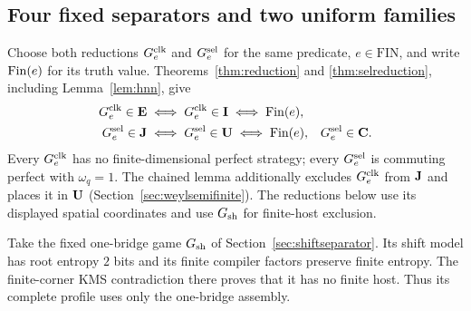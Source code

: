 \subsection{Four fixed separators and two uniform families}
Choose both reductions $G^{\rm clk}_e$ and $G^{\rm sel}_e$ for the same predicate, $e\in\mathrm{FIN}$, and write $\mathrm{Fin}(e)$ for its truth value. Theorems~\ref{thm:reduction} and \ref{thm:selreduction}, including Lemma~\ref{lem:hnn}, give
\begin{align}
 G^{\rm clk}_e\in\mathbf E&\iff G^{\rm clk}_e\in\mathbf I\iff \mathrm{Fin}(e),
 &&\label{eq:sharedE}\\
 G^{\rm sel}_e\in\mathbf J&\iff G^{\rm sel}_e\in\mathbf U\iff \mathrm{Fin}(e),
 &G^{\rm sel}_e&\in\mathbf C.\label{eq:sharedJ}
\end{align}
Every $G^{\rm clk}_e$ has no finite-dimensional perfect strategy; every $G^{\rm sel}_e$ is commuting perfect with $\omega_q=1$. The chained lemma additionally excludes $G^{\rm clk}_e$ from $\mathbf J$ and places it in $\mathbf U$ (Section~\ref{sec:weylsemifinite}). The reductions below use its displayed spatial coordinates and use $G_{\rm sh}$ for finite-host exclusion.

Take the fixed one-bridge game $G_{\rm sh}$ of Section~\ref{sec:shiftseparator}. Its shift model has root entropy $2$ bits and its finite compiler factors preserve finite entropy. The finite-corner KMS contradiction there proves that it has no finite host. Thus its complete profile uses only the one-bridge assembly.

